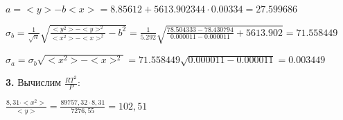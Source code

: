 \documentclass[12pt,a4paper]{article}
\begin{document}
$a =<y> - b<x> = 8.85612 + 5613.902344 \cdot 0.00334 = 27.599686$

\vspace{0,5cm}

$\sigma_b = \frac{1}{\sqrt{n}} \sqrt { \frac{<y^2> - <y>^2}{<x^2> - <x>^2}  - b^2} = \frac{1}{5.292} \sqrt {\frac{78.504333 - 78.430794}{0.000011 - 0.000011} + 5613.902} = 71.558449$

\vspace{0,5cm}

$\sigma_a = \sigma_b \sqrt{<x^2> - <x>^2} = 71.558449 \sqrt{0.000011 - 0.000011} = 0.003449$

\vspace{0,5cm}

\textbf{3.} Вычислим $\frac{RT^2}{P}$:

$\frac{8,31 \cdot <x^2>}{<y>} = \frac{89757,32 \cdot 8,31}{7276,55} = 102,51$
\end{document}
